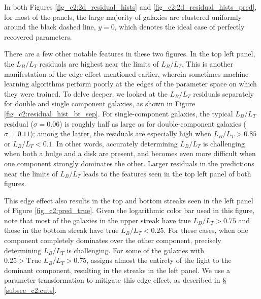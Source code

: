 In both Figures \ref{fig_c2:2d_residual_hists} and \ref{fig_c2:2d_residual_hists_pred}, for most of the panels, the large majority of galaxies are clustered uniformly around the black dashed line, $y = 0$, which denotes the ideal case of perfectly recovered parameters.%

There are a few other notable features in these two figures. In the top left panel, the $L_B/L_T$ residuals are highest near the limits of $L_B/L_T$. This is another manifestation of the edge-effect mentioned earlier, wherein sometimes machine learning algorithms perform poorly at the edges of the parameter space on which they were trained.  To delve deeper, we looked at the $L_B/L_T$ residuals separately for double and single component galaxies, as shown in Figure \ref{fig_c2:residual_hist_bt_sep}. 
For single-component galaxies, the typical $L_B/L_T$ residual ($\sigma=0.06$) is roughly half as large as for double-component galaxies ($\sigma=0.11$);
among the latter, the residuals are especially high when $L_B/L_T > 0.85$ or $L_B/L_T < 0.1$. In other words, accurately determining $L_B/L_T$ is challenging when both a bulge and a disk are present, and becomes even more difficult when one component strongly dominates the other. %
Larger residuals in the predictions near the limits of $L_B/L_T$ leads to the features seen in the top left panel of both figures.

This edge effect also results in the top and bottom streaks seen in the left panel of Figure \ref{fig_c2:pred_true}. Given the logarithmic  color bar used in this figure, note that most of the galaxies in the upper streak have true $L_B/L_T > 0.75$ and those in the bottom streak have true $L_B/L_T < 0.25$. For these cases, when one component completely dominates over the other component, precisely determining $L_B/L_T$ is challenging. For some of the galaxies with $0.25 > \mathrm{True}\,\,L_B/L_T > 0.75$, \gampen{} assigns almost the entirety of the light to the dominant component, resulting in the streaks in the left panel. We use a parameter transformation to mitigate this edge effect, as described in \S\,\ref{subsec_c2:cuts}. 

